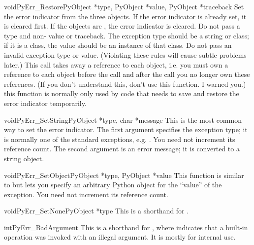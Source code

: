 \documentclass{manual}
\begin{document}
\begin{cfuncdesc}{void}{PyErr_Restore}{PyObject *type, PyObject *value, PyObject *traceback}
Set  the error indicator from the three objects.  If the error
indicator is already set, it is cleared first.  If the objects are
\NULL{}, the error indicator is cleared.  Do not pass a \NULL{} type
and non-\NULL{} value or traceback.  The exception type should be a
string or class; if it is a class, the value should be an instance of
that class.  Do not pass an invalid exception type or value.
(Violating these rules will cause subtle problems later.)  This call
takes away a reference to each object, i.e. you must own a reference
to each object before the call and after the call you no longer own
these references.  (If you don't understand this, don't use this
function.  I warned you.)   this function is normally
only used by code that needs to save and restore the error indicator
temporarily.
\end{cfuncdesc}

\begin{cfuncdesc}{void}{PyErr_SetString}{PyObject *type, char *message}
This is the most common way to set the error indicator.  The first
argument specifies the exception type; it is normally one of the
standard exceptions, e.g. .  You need not
increment its reference count.  The second argument is an error
message; it is converted to a string object.
\end{cfuncdesc}

\begin{cfuncdesc}{void}{PyErr_SetObject}{PyObject *type, PyObject *value}
This function is similar to  but lets you
specify an arbitrary Python object for the ``value'' of the exception.
You need not increment its reference count.
\end{cfuncdesc}

\begin{cfuncdesc}{void}{PyErr_SetNone}{PyObject *type}
This is a shorthand for .
\end{cfuncdesc}

\begin{cfuncdesc}{int}{PyErr_BadArgument}{}
This is a shorthand for , where  indicates that a built-in operation
was invoked with an illegal argument.  It is mostly for internal use.
\end{cfuncdesc}
\end{document}
